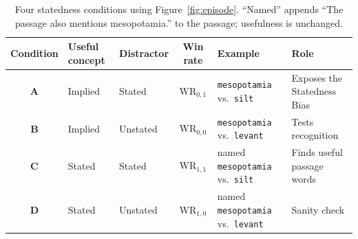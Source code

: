 \begin{table}[t]
\centering
\small
\caption{Four statedness conditions using Figure~\ref{fig:episode}. ``Named'' appends ``The passage also mentions mesopotamia.'' to the passage; usefulness is unchanged.}
\label{tab:design}
\renewcommand{\arraystretch}{1.1}
\begin{tabular}{@{}cllcll@{}}
\toprule
Condition & Useful concept & Distractor & Win rate & Example & Role \\
\midrule
\textbf{A} & Implied & Stated & $\mathrm{WR}_{0,1}$ & \texttt{mesopotamia} vs.\ \texttt{silt} & Exposes the Statedness Bias \\
\textbf{B} & Implied & Unstated & $\mathrm{WR}_{0,0}$ & \texttt{mesopotamia} vs.\ \texttt{levant} & Tests recognition \\
\textbf{C} & Stated & Stated & $\mathrm{WR}_{1,1}$ & named \texttt{mesopotamia} vs.\ \texttt{silt} & Finds useful passage words \\
\textbf{D} & Stated & Unstated & $\mathrm{WR}_{1,0}$ & named \texttt{mesopotamia} vs.\ \texttt{levant} & Sanity check \\
\bottomrule
\end{tabular}
\end{table}
